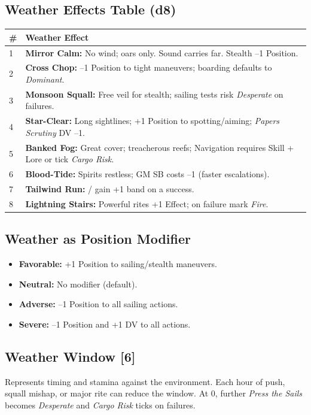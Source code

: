\documentclass[11pt,oneside]{book}
\newcommand{\tagpill}[1]{\begingroup
  \setlength{\fboxsep}{1pt}\color{black}\fbox{\footnotesize\textsf{#1}}
\endgroup}
\begin{document}
\subsection*{Weather Effects Table (d8)}
\begin{tabularx}{\linewidth}{@{}p{0.7cm} X@{}}
\toprule
\# & \textbf{Weather Effect}\\
\midrule
1 & \textbf{Mirror Calm:} No wind; oars only. Sound carries far. Stealth --1 Position.\\
2 & \textbf{Cross Chop:} --1 Position to tight maneuvers; boarding defaults to \emph{Dominant}.\\
3 & \textbf{Monsoon Squall:} Free veil for stealth; sailing tests risk \emph{Desperate} on failures.\\
4 & \textbf{Star-Clear:} Long sightlines; +1 Position to spotting/aiming; \textit{Papers Scrutiny} DV --1.\\
5 & \textbf{Banked Fog:} Great cover; treacherous reefs; Navigation requires Skill + Lore or tick \textit{Cargo Risk}.\\
6 & \textbf{Blood-Tide:} Spirits restless; GM SB costs --1 (faster escalations).\\
7 & \textbf{Tailwind Run:} \tagpill{FAST}/\tagpill{SPRINTER} gain +1 band on a success.\\
8 & \textbf{Lightning Stairs:} Powerful rites +1 Effect; on failure mark \textit{Fire}.\\
\bottomrule
\end{tabularx}

\subsection*{Weather as Position Modifier}
\begin{itemize}
  \item \textbf{Favorable:} +1 Position to sailing/stealth maneuvers.
  \item \textbf{Neutral:} No modifier (default).
  \item \textbf{Adverse:} --1 Position to all sailing actions.
  \item \textbf{Severe:} --1 Position and +1 DV to all actions.
\end{itemize}

\subsection*{Weather Window [6]}
Represents timing and stamina against the environment. Each hour of push, squall mishap, or major rite can reduce the window. At 0, further \emph{Press the Sails} becomes \emph{Desperate} and \textit{Cargo Risk} ticks on failures.
\end{document}
